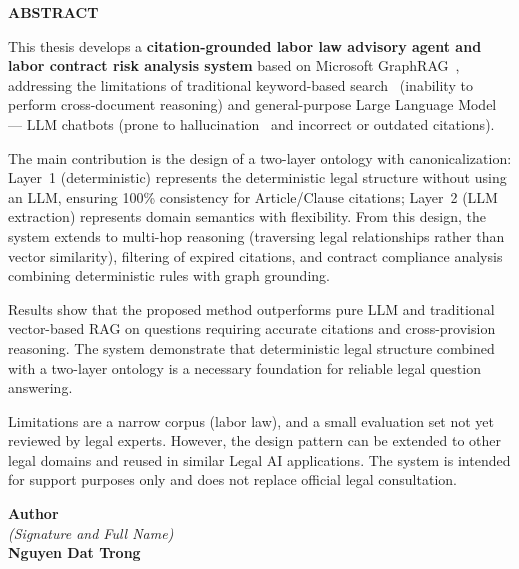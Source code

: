 \documentclass[../DoAn.tex]{subfiles}
\begin{document}
\begin{center}
\Large{\textbf{ABSTRACT}}
\end{center}

\vspace{0.8cm}

This thesis develops a \textbf{citation-grounded labor law advisory agent and labor contract risk analysis system} based on Microsoft \gls{GraphRAG}~\cite{graphrag2024}, addressing the limitations of traditional keyword-based search~\cite{robertson1994bm25} (inability to perform cross-document reasoning) and general-purpose Large Language Model --- LLM chatbots (prone to hallucination~\cite{ji2023hallucination} and incorrect or outdated citations).

The main contribution is the design of a two-layer ontology with canonicalization: Layer~1 (deterministic) represents the deterministic legal structure without using an LLM, ensuring 100\% consistency for Article/Clause citations; Layer~2 (LLM extraction) represents domain semantics with flexibility. From this design, the system extends to multi-hop reasoning (traversing legal relationships rather than vector similarity), filtering of expired citations, and contract compliance analysis combining deterministic rules with graph grounding.

Results show that the proposed method outperforms pure \gls{LLM} and traditional vector-based \gls{RAG} on questions requiring accurate citations and cross-provision reasoning. The system demonstrate that deterministic legal structure combined with a two-layer ontology is a necessary foundation for reliable legal question answering.

Limitations are a narrow corpus (labor law), and a small evaluation set not yet reviewed by legal experts. However, the design pattern can be extended to other legal domains and reused in similar Legal AI applications. The system is intended for support purposes only and does not replace official legal consultation.

\vspace{1.5cm}

\begin{flushright}
\textbf{Author}\\[0.1cm]
\textit{(Signature and Full Name)}\\[2.5cm]
\textbf{Nguyen Dat Trong}
\end{flushright}
\end{document}
